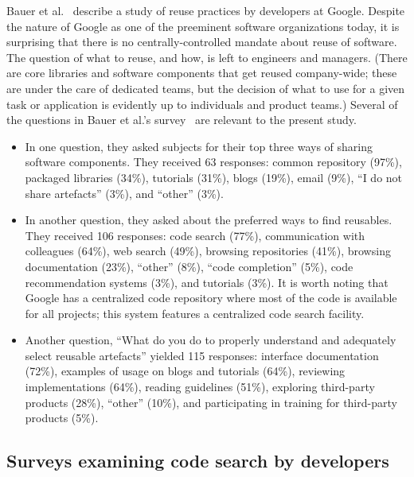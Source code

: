 \documentclass{casicswhitepaper}
\begin{document}
Bauer et al.~\cite{bauer2014exploratory} describe a study of reuse practices by developers at Google.  Despite the nature of Google as one of the preeminent software organizations today, it is surprising that there is no centrally-controlled mandate about reuse of software.  The question of what to reuse, and how, is left to engineers and managers.  (There are core libraries and software components that get reused company-wide; these are under the care of dedicated teams, but the decision of what to use for a given task or application is evidently up to individuals and product teams.)  Several of the questions in Bauer et al.'s survey~\cite{bauer2014exploratory} are relevant to the present study.
\begin{itemize}

\item In one question, they asked subjects for their top three ways of sharing software components.  They received 63 responses: common repository (97\%), packaged libraries (34\%), tutorials (31\%), blogs (19\%), email (9\%), ``I do not share artefacts'' (3\%), and ``other'' (3\%).

\item In another question, they asked about the preferred ways to find reusables.  They received 106 responses: code search (77\%), communication with colleagues (64\%), web search (49\%), browsing repositories (41\%), browsing documentation (23\%), ``other'' (8\%), ``code completion'' (5\%), code recommendation systems (3\%), and tutorials (3\%).  It is worth noting that Google has a centralized code repository where most of the code is available for all projects; this system features a centralized code search facility.

\item Another question, ``What do you do to properly understand and adequately select reusable artefacts'' yielded 115 responses: interface documentation (72\%), examples of usage on blogs and tutorials (64\%), reviewing implementations (64\%), reading guidelines (51\%), exploring third-party products (28\%), ``other'' (10\%), and participating in training for third-party products (5\%).

\end{itemize}


\subsection{Surveys examining code search by developers}
\end{document}

